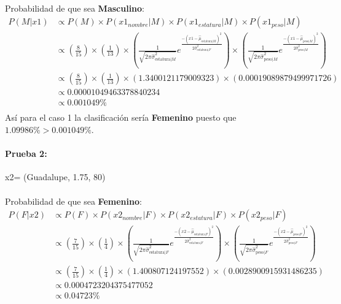 \documentclass[12pt]{article}
\begin{document}
\paragraph{}Probabilidad de que sea \textbf{Masculino}:\\
\begin{equation}
\begin{split}
P(M|x1) &\propto P(M) \times P(x1_{nombre}|M) \times P(x1_{estatura}|M) \times P(x1_{peso}|M) \\
&\propto (\frac{8}{15}) \times (\frac{1}{13}) \times (\frac{1}{\sqrt{2\pi\hat{\sigma}_{\text{estatura}|M}^2}}e^{\frac{-(x1 - \hat{\mu}_{\text{estatura}|M})^2}{2\hat{\sigma}_{\text{estatura}|F}^2}}) \times (\frac{1}{\sqrt{2\pi\hat{\sigma}_{\text{peso}|M}^2}}e^{\frac{-(x1 - \hat{\mu}_{\text{peso}|M})^2}{2\hat{\sigma}_{\text{peso}|M}^2}}) \\
&\propto (\frac{8}{15}) \times (\frac{1}{13}) \times (1.3400121179009323) \times (0.00019089879499971726) \\
&\propto 0.00001049463378840234 \\
&\propto 0.001049 \% \\
\end{split}
\end{equation}
Así para el caso 1 la clasificación sería \textbf{Femenino} puesto que $1.09986\% > 0.001049\%$.\\
\clearpage
\pagebreak
\paragraph{Prueba 2: }x2= (Guadalupe, 1.75, 80)
\paragraph{}Probabilidad de que sea \textbf{Femenino}:\\
\begin{equation}
\begin{split}
P(F|x2) &\propto P(F) \times P(x2_{nombre}|F) \times P(x2_{estatura}|F) \times P(x2_{peso}|F) \\
&\propto (\frac{7}{15}) \times (\frac{1}{4}) \times (\frac{1}{\sqrt{2\pi\hat{\sigma}_{\text{estatura}|F}^2}}e^{\frac{-(x2 - \hat{\mu}_{\text{estatura}|F})^2}{2\hat{\sigma}_{\text{estatura}|F}^2}}) \times (\frac{1}{\sqrt{2\pi\hat{\sigma}_{\text{peso}|F}^2}}e^{\frac{-(x2 - \hat{\mu}_{\text{peso}|F})^2}{2\hat{\sigma}_{\text{peso}|F}^2}}) \\
&\propto (\frac{7}{15}) \times (\frac{1}{4}) \times (1.400807124197552) \times (0.0028900915931486235) \\
&\propto 0.0004723204375477052 \\
&\propto 0.04723\% \\
\end{split}
\end{equation}
\end{document}
